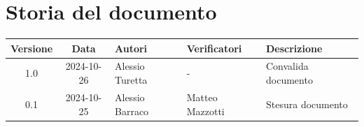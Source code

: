 \section{Storia del documento}
\begin{center}
\begin{tabularx}{\textwidth}{ c c p{2.75cm} p{2.75cm} X }
    \rowcolor{gray!20}\rule{0pt}{0.5cm}\textbf{Versione} & \textbf{Data} & \textbf{Autori} & \textbf{Verificatori} & \textbf{Descrizione} \\[0.7ex]
    \hline
    \rule{0pt}{0.5cm}1.0 & 2024-10-26 & Alessio Turetta & - & Convalida documento \\[0.7ex]
    \hline
    \rule{0pt}{0.5cm}0.1 & 2024-10-25 & Alessio Barraco & Matteo Mazzotti & Stesura documento \\[0.7ex]
\end{tabularx}
\end{center}